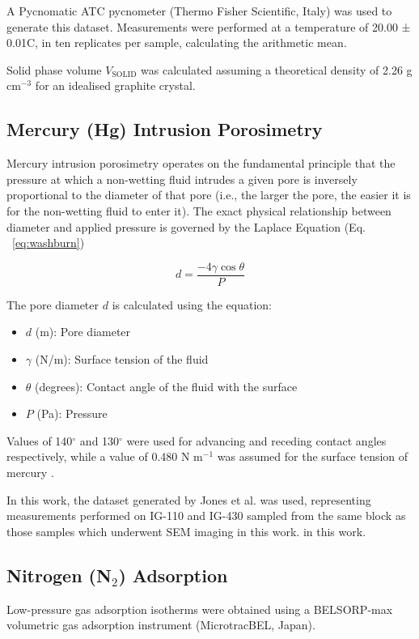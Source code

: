 \documentclass[review]{elsarticle}
\begin{document}
A Pycnomatic ATC pycnometer (Thermo Fisher Scientific, Italy) was used to
generate this dataset. Measurements were performed at a temperature of 20.00 ±
0.01\textdegree{}C,  in ten replicates per sample, calculating the arithmetic
mean. 

Solid phase volume $V_{\mathrm{SOLID}}$ was calculated assuming a theoretical
density of 2.26 g cm$^{-3}$ for an idealised graphite crystal. 

\subsection{Mercury (Hg) Intrusion Porosimetry}
Mercury intrusion porosimetry operates on the fundamental principle that the
pressure at which a non-wetting fluid intrudes a given pore is inversely
proportional to the diameter of that pore (i.e., the larger the pore, the easier
it is for the non-wetting fluid to enter it). The exact physical relationship
between diameter and applied pressure is governed by the Laplace Equation (Eq.
~\ref{eq:washburn})
	
	\begin{equation} \label{eq:washburn}
		d = \frac{-4\gamma \cos \theta}{P}
	\end{equation}

		The pore diameter \(d\) is calculated using the equation:
	\begin{itemize}
		\item $d$ (m): Pore diameter
		\item $\gamma$ (N/m): Surface tension of the fluid
		\item $\theta$ (degrees): Contact angle of the fluid with the surface
		\item $P$ (Pa): Pressure
	\end{itemize}

Values of 140$^{\circ}$ and 130$^{\circ}$ were used for advancing and receding
contact angles respectively, while a value of 0.480 N m$^{-1}$ was assumed for the
surface tension of mercury \citep{VANBRAKEL19811}.  

In this work, the dataset generated by Jones et al. \citep{Jones2018} was used,
representing measurements performed on IG-110 and IG-430 sampled from the same
block as those samples which underwent SEM imaging in this work. in this work.

\subsection{Nitrogen (N$_2$) Adsorption}
Low-pressure gas adsorption isotherms were obtained using a BELSORP-max
volumetric gas adsorption instrument (MicrotracBEL, Japan). 
\end{document}
